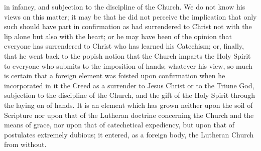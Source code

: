 in infancy, and subjection to the discipline of the Church. We do not know his views on this matter; it may be that he did not perceive the implication that only such should have part in confirmation as had surrendered to Christ not with the lip alone but also with the heart; or he may have been of the opinion that everyone has surrendered to Christ who has learned his Catechism; or, finally, that he went back to the popish notion that the Church imparts the Holy Spirit to everyone who submits to the imposition of hands; whatever his view, so much is certain that a foreign element was foisted upon confirmation when he incorporated in it the Creed as a surrender to Jesus Christ or to the Triune God, subjection to the discipline of the Church, and the gift of the Holy Spirit through the laying on of hands. It is an element which has grown neither upon the soil of Scripture nor upon that of the Lutheran doctrine concerning the Church and the means of grace, nor upon that of catechetical expediency, but upon that of postulates extremely dubious; it entered, as a foreign body, the Lutheran Church from without.

